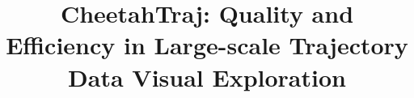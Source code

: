 \documentclass[conference]{IEEEtran}
\begin{document}
\title{CheetahTraj: Quality and Efficiency in Large-scale Trajectory Data Visual Exploration
}

\author{
\and
{}

}

\maketitle

\newtheorem{problem}{Problem}
\newtheorem{lemma}{Lemma}
\newtheorem{theorem}{Theorem}
\newcommand{\Bo}[1]{{\color{red} Bo: #1}}
\newcommand{\QM}[1]{{\color{blue}{#1}}}

\newcommand{\D}{\mathcal{T}}
\newcommand{\V}{\mathsf{V}}
\newcommand{\oR}{\mathcal{R}}
\newcommand{\MU}{\mathsf{U}}
\newcommand{\vats}{\mathsf{VQGS}}
\newcommand{\rand}{\mathsf{RAND}}
\newcommand{\full}{\mathsf{FULL}}
\newcommand{\avats}{\mathsf{CheetahTraj}}
\newcommand{\cavats}{\mathsf{CheetahTraj}\mathsf{CE}}
\newcommand{\qtavats}{\mathsf{CheetahTraj}-\mathsf{QT}}
\newcommand{\sz}{\textsf{Shenzhen}}
\newcommand{\pt}{\textsf{Porto}}
\newcommand{\cd}{\textsf{Chengdu}}
\newcommand{\trim}{\vspace{-2mm}}

\newcommand{\baseline}{\mathsf{baseline}}

\newcommand{\stitle}[1]{\vspace*{0.4em}\noindent{\bf #1:\/}}
\newcommand{\sstitle}[1]{\vspace*{0.4em}\noindent{\bf #1\/.}}


\newcommand{\localavats}{\mathsf{local+fix}}

\newcommand{\squishlist}{
	\begin{list}{$\bullet$}
		{ \setlength{\itemsep}{0pt}
			\setlength{\parsep}{3pt}
			\setlength{\topsep}{3pt}
			\setlength{\partopsep}{0pt}
			\setlength{\leftmargin}{1.2em}
			\setlength{\labelwidth}{1em}
			\setlength{\labelsep}{0.6em}
		}
	}
	\newcommand{\squishend}{
	\end{list}
}
\end{document}
